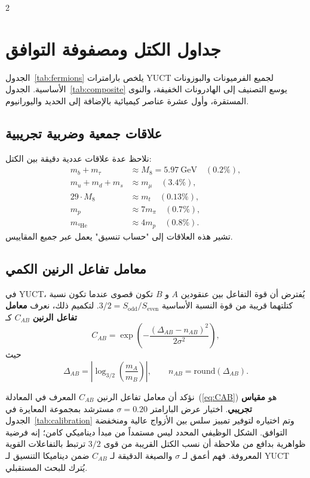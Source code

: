 \documentclass[11pt,a4paper]{article}
\begin{document}
	\begin{multicols}{2}
		
		\section{جداول الكتل ومصفوفة التوافق}
		\label{sec:tables}
		
		الجدول~\ref{tab:fermions} يلخص بارامترات YUCT لجميع الفرميونات والبوزونات الأساسية. الجدول~\ref{tab:composite} يوسع التصنيف إلى الهادرونات الخفيفة، والنوى المستقرة، وأول عشرة عناصر كيميائية بالإضافة إلى الحديد واليورانيوم.
		
		\subsection{علاقات جمعية وضربية تجريبية}
		
		نلاحظ عدة علاقات عددية دقيقة بين الكتل:
		\begin{align*}
			m_b + m_\tau &\approx M_8 = 5.97\ \text{GeV} \quad (0.2\%),\\
			m_u + m_d + m_s &\approx m_\mu \quad (3.4\%),\\
			29 \cdot M_8 &\approx m_t \quad (0.13\%),\\
			m_p &\approx 7 m_\pi \quad (0.7\%),\\
			m_{^4\mathrm{He}} &\approx 4 m_p \quad (0.8\%).
		\end{align*}
		تشير هذه العلاقات إلى "حساب تنسيق" يعمل عبر جميع المقاييس.
		
		\subsection{معامل تفاعل الرنين الكمي}
		
		في YUCT، يُفترض أن قوة التفاعل بين عنقودين \(A\) و \(B\) تكون قصوى عندما تكون نسبة كتلتهما قريبة من قوة النسبة الأساسية \(3/2 = S_{\mathrm{odd}}/S_{\mathrm{even}}\). لتكميم ذلك، نعرف \textbf{معامل تفاعل الرنين} \(C_{AB}\) كـ
		\begin{equation}
			C_{AB} = \exp\left( - \frac{(\Delta_{AB} - n_{AB})^2}{2\sigma^2} \right),
			\label{eq:CAB}
		\end{equation}
		حيث
		\[
		\Delta_{AB} = \left| \log_{3/2}\left( \frac{m_A}{m_B} \right) \right|, \qquad n_{AB} = \text{round}(\Delta_{AB}).
		\]
		
		نؤكد أن معامل تفاعل الرنين \(C_{AB}\) المعرف في المعادلة~(\ref{eq:CAB}) هو \textbf{مقياس تجريبي}. اختيار عرض البارامتر \(\sigma = 0.20\) مسترشد بمجموعة المعايرة في الجدول~\ref{tab:calibration} وتم اختياره لتوفير تمييز سلس بين الأزواج عالية ومنخفضة التوافق. الشكل الوظيفي المحدد ليس مستمداً من مبدأ ديناميكي كامن؛ إنه فرضية ظواهرية بدافع من ملاحظة أن نسب الكتل القريبة من قوى \(3/2\) ترتبط بالتفاعلات القوية المعروفة. فهم أعمق لـ \(\sigma\) والصيغة الدقيقة لـ \(C_{AB}\) ضمن ديناميكا التنسيق لـ YUCT يُترك للبحث المستقبلي.
		

\end{multicols}
\end{document}
